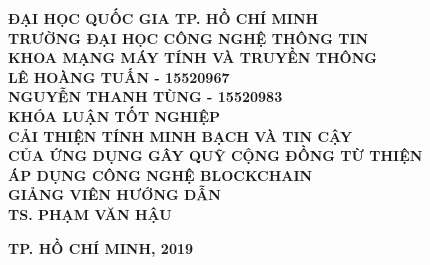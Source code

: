 \documentclass[../main-report.tex]{subfiles}
\begin{document}
\begin{titlepage}
\thispagestyle{empty}
\thisfancypage{
\setlength{\fboxsep}{3pt}
\fbox}{} 
\begin{center}
{\bf\large ĐẠI HỌC QUỐC GIA TP. HỒ CHÍ MINH}\\
{\bf\subtitlesize TRƯỜNG ĐẠI HỌC CÔNG NGHỆ THÔNG TIN}\\
{\bf\subtitlesize KHOA MẠNG MÁY TÍNH VÀ TRUYỀN THÔNG}\\[5cm]


{\bf\large LÊ HOÀNG TUẤN - 15520967}\\
{\bf\large NGUYỄN THANH TÙNG - 15520983}\\[2cm]

{\bf\large KHÓA LUẬN TỐT NGHIỆP}\\[0.5cm]
{\bf\Large CẢI THIỆN TÍNH MINH BẠCH VÀ TIN CẬY}\\
{\bf\Large CỦA ỨNG DỤNG GÂY QUỸ CỘNG ĐỒNG TỪ THIỆN}\\
{\bf\Large ÁP DỤNG CÔNG NGHỆ BLOCKCHAIN}\\[6.5cm]

{\bf GIẢNG VIÊN HƯỚNG DẪN}\\
{\bf TS. PHẠM VĂN HẬU}
\end{center}

\vspace{2.5cm}
\begin{center}
{\bf TP. HỒ CHÍ MINH, 2019}
\end{center}
\end{titlepage}
\end{document}
